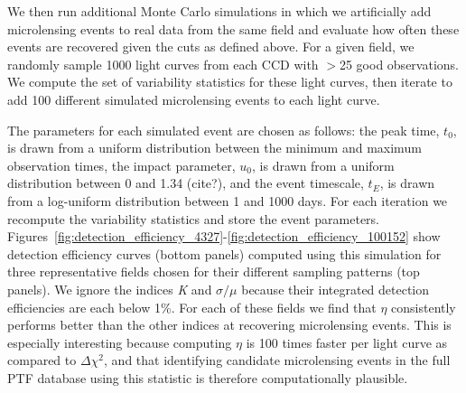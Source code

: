 \documentclass[12pt,preprint]{aastex}
\newcommand{\apwsim}{\raisebox{0.2ex}{\scriptsize$\sim$\normalsize}}
\begin{document}
We then run additional Monte Carlo simulations in which we artificially add microlensing events to real data from the same field and evaluate how often these events are recovered given the cuts as defined above. For a given field, we randomly sample 1000 light curves from each CCD with $>$25 good observations. We compute the set of variability statistics for these light curves, then iterate to add 100 different simulated microlensing events to each light curve. 

The parameters for each simulated event are chosen as follows: the peak time, $t_0$, is drawn from a uniform distribution between the minimum and maximum observation times, the impact parameter, $u_0$, is drawn from a uniform distribution between 0 and 1.34 (cite?), and the event timescale, $t_E$, is drawn from a log-uniform distribution between 1 and 1000 days. For each iteration we recompute the variability statistics and store the event parameters. Figures~\ref{fig:detection_efficiency_4327}-\ref{fig:detection_efficiency_100152} show detection efficiency curves (bottom panels) computed using this simulation for three representative fields chosen for their different sampling patterns (top panels). We ignore the indices \textit{K} and $\sigma/\mu$ because their integrated detection efficiencies are each below 1\%. For each of these fields we find that $\eta$ consistently performs better than the other indices at recovering microlensing events. This is especially interesting because computing $\eta$ is \apwsim100 times faster per light curve as compared to $\Delta\chi^2$, and that identifying candidate microlensing events in the full PTF database using this statistic is therefore computationally plausible.


\end{document}

